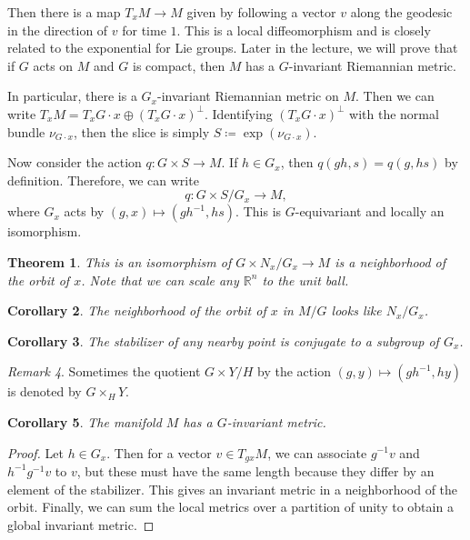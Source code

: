 \documentclass[leqno, openany]{memoir}
\newtheorem{thm}{Theorem}[section]
\newtheorem{cor}[thm]{Corollary}
\theoremstyle{definition}
\theoremstyle{remark}
\newtheorem{rmk}[thm]{Remark}
\theoremstyle{plain}
\theoremstyle{definition}
\theoremstyle{remark}
\newcommand{\R}{\mathbb{R}}
\begin{document}
Then there is a map $T_x M \to M$ given by following a vector $v$ along the
geodesic in the direction of $v$ for time $1$. This is a local diffeomorphism
and is closely related to the exponential for Lie groups. Later in the lecture,
we will prove that if $G$ acts on $M$ and $G$ is compact, then $M$ has a
$G$-invariant Riemannian metric.

In particular, there is a $G_x$-invariant Riemannian metric on $M$. Then we can
write $T_x M = T_x G \cdot x \oplus ( T_x G \cdot x )^{\perp}$. Identifying
$(T_x G \cdot x)^{\perp}$ with the normal bundle $\nu_{ G \cdot x }$, then the
slice is simply $S \coloneqq \exp(\nu_{G \cdot x})$.

Now consider the action $q: G \times S \to M$. If $h \in G_x$, then $q(gh,s) =
q(g,hs)$ by definition. Therefore, we can write \[ q: G \times S / G_x \to M,
\] where $G_x$ acts by $(g,x) \mapsto (gh^{-1},hs)$. This is $G$-equivariant
and locally an isomorphism.

\begin{thm} This is an isomorphism of $G \times N_x / G_x \to M$ is a
neighborhood of the orbit of $x$. Note that we can scale any $\R^n$ to the unit
ball.  \end{thm}

\begin{cor} The neighborhood of the orbit of $x$ in $M / G$ looks like $N_x /
G_x$.  \end{cor}

\begin{cor} The stabilizer of any nearby point is conjugate to a subgroup of
$G_x$.  \end{cor}

\begin{rmk} Sometimes the quotient $G \times Y / H$ by the action $(g,y)
\mapsto (gh^{-1},hy)$ is denoted by $G \times_H Y$.  \end{rmk}

\begin{cor} The manifold $M$ has a $G$-invariant metric.  \end{cor}

\begin{proof} Let $h \in G_x$. Then for a vector $v \in T_{gx}M$, we can
    associate $g^{-1}v$ and $h^{-1} g^{-1}v$ to $v$, but these must have the
    same length because they differ by an element of the stabilizer. This gives
    an invariant metric in a neighborhood of the orbit. Finally, we can sum the
    local metrics over a partition of unity to obtain a global invariant
    metric.  \end{proof}
\end{document}
